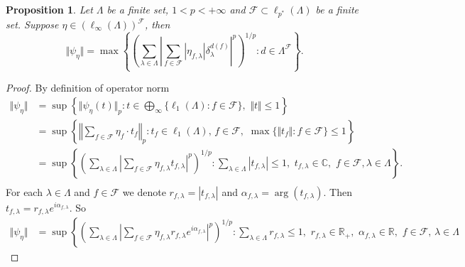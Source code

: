 \documentclass[12pt]{article}
\newtheorem{proposition}[theorem]{Proposition}
\begin{document}
\begin{proposition}\label{ExtMorphNorm}
    Let $\Lambda$ be a finite set, $1<p<+\infty$ 
    and $\mathcal{F}\subset\ell_{p^*}(\Lambda)$ be a finite set. 
    Suppose $\eta\in(\ell_\infty(\Lambda))^\mathcal{F}$, then 
    \[
        \Vert \psi_{\eta}\Vert
        =\max\left\{
            \left(\sum_{\lambda\in\Lambda}
                \left|
                    \sum_{f\in\mathcal{F}} |\eta_{f,\lambda}| 
                    \delta_{\lambda}^{d(f)}
                \right|^p
            \right)^{1/p} : 
            d\in\Lambda^\mathcal{F}
        \right\}.
    \]
\end{proposition}
\begin{proof}
    By definition of operator norm
    \[
    \begin{aligned}
        \Vert\psi_{\eta}\Vert
        &=\sup\left\{
            \Vert\psi_{\eta}(t)\Vert_p:
            t\in \bigoplus_\infty\{\ell_1(\Lambda):f\in\mathcal{F}\},\,\,
            \Vert t\Vert\leq 1
        \right\} \\
        &=\sup\left\{
            \left \Vert\sum_{f\in\mathcal{F}}\eta_f\cdot t_f\right \Vert_p:
            t_f\in\ell_1(\Lambda),\, f\in\mathcal{F},\,\,
            \max\{\Vert t_f\Vert:f\in\mathcal{F}\}\leq 1
        \right\} \\
        &=\sup\left\{
            \left(\sum_{\lambda\in\Lambda}
                \left|
                    \sum_{f\in\mathcal{F}}\eta_{f,\lambda} t_{f,\lambda}
                \right|^p
            \right)^{1/p}:
            \sum_{\lambda\in\Lambda} |t_{f,\lambda}|\leq 1,\,\, 
            t_{f,\lambda}\in\mathbb{C},\,\, f\in\mathcal{F}, \lambda\in\Lambda
        \right\}. \\
    \end{aligned}
    \]
    For each $\lambda\in\Lambda$ and $f\in\mathcal{F}$ we 
    denote $r_{f,\lambda}=|t_{f,\lambda}|$ 
    and $\alpha_{f,\lambda}=\operatorname{arg}(t_{f,\lambda})$. 
    Then $t_{f,\lambda}=r_{f,\lambda} e^{i \alpha_{f,\lambda}}$. So
    \[
    \begin{aligned}
        \Vert \psi_{\eta}\Vert
        &=\sup\left\{
            \left(\sum_{\lambda\in\Lambda}
                \left|
                    \sum_{f\in\mathcal{F}}
                        \eta_{f,\lambda} r_{f,\lambda} e^{i \alpha_{f,\lambda}}
                \right|^p
            \right)^{1/p}:
            \sum_{\lambda\in\Lambda} r_{f,\lambda}\leq 1,\,\, 
            r_{f,\lambda}\in\mathbb{R}_+,\,\, 
            \alpha_{f,\lambda}\in\mathbb{R},\,\, 
            f\in\mathcal{F},\, \lambda\in\Lambda

\end{aligned}\]
\end{proof}
\end{document}
